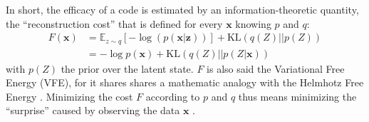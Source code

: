 \documentclass[12pt,twoside,openright]{article}
\begin{document}
{	In short, the efficacy of a code is estimated by an information-theoretic quantity, the ``reconstruction cost'' that is defined for every $\boldsymbol{x}$ knowing $p$ and $q$:
	\begin{align}
	F(\boldsymbol{x}) %
	&= \mathbb{E}_{z\sim q} \left[-\log (p(\boldsymbol{x}|\boldsymbol{z}))\right] +\text{KL}(q(Z)||p(Z))
	\label{eq:FEP-prior}\\
	&= - \log p(\boldsymbol{x}) + \text{KL}(q(Z)||p(Z|\boldsymbol{x}))
	\label{eq:FEP}
	\end{align}
	with $p(Z)$ the prior over the latent state.
	$F$ is also said the Variational Free Energy (VFE), for it shares shares a mathematic analogy with the Helmhotz Free Energy \citep{friston2010free}.
	Minimizing the cost $F$ according to $p$ and $q$ thus means minimizing the ``surprise'' caused by observing the data $\boldsymbol{x}$ \citep{friston2010free}.
	
}
\end{document}
